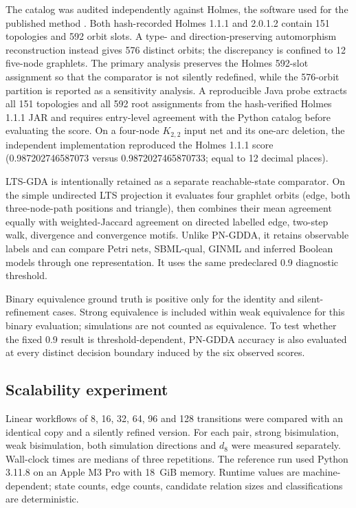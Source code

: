 \documentclass[pdflatex,sn-mathphys-ay]{sn-jnl}
\theoremstyle{definition}
\begin{document}
The catalog was audited independently against Holmes, the software used for the
published method \citep{Radom2017}. Both hash-recorded Holmes 1.1.1 and 2.0.1.2
contain 151 topologies and 592 orbit slots. A type- and direction-preserving
automorphism reconstruction instead gives 576 distinct orbits; the discrepancy
is confined to 12 five-node graphlets. The primary analysis preserves the Holmes
592-slot assignment so that the comparator is not silently redefined, while the
576-orbit partition is reported as a sensitivity analysis. A reproducible Java
probe extracts all 151 topologies and all 592 root assignments from the
hash-verified Holmes 1.1.1 JAR and requires entry-level agreement with the
Python catalog before evaluating the score. On a four-node
$K_{2,2}$ input net and its one-arc deletion, the independent implementation
reproduced the Holmes 1.1.1 score (0.987202746587073 versus
0.9872027465870733; equal to 12 decimal places).

LTS-GDA is intentionally retained as a separate reachable-state comparator. On
the simple undirected LTS projection it evaluates four graphlet orbits (edge,
both three-node-path positions and triangle), then combines their mean agreement
equally with weighted-Jaccard agreement on directed labelled edge, two-step
walk, divergence and convergence motifs. Unlike PN-GDDA, it retains observable
labels and can compare Petri nets, SBML-qual, GINML and inferred Boolean models
through one representation. It uses the same predeclared 0.9 diagnostic
threshold.

Binary equivalence ground truth is positive only for the identity and silent-
refinement cases. Strong equivalence is included within weak equivalence for this
binary evaluation; simulations are not counted as equivalence. To test whether
the fixed 0.9 result is threshold-dependent, PN-GDDA accuracy is also evaluated
at every distinct decision boundary induced by the six observed scores.

\subsection{Scalability experiment}\label{sec:scalability-method}

Linear workflows of 8, 16, 32, 64, 96 and 128 transitions were compared with an
identical copy and a silently refined version. For each pair, strong bisimulation,
weak bisimulation, both simulation directions and $d_8$ were measured separately.
Wall-clock times are medians of three repetitions. The reference run used Python
3.11.8 on an Apple M3 Pro with 18~GiB memory. Runtime values are machine-dependent;
state counts, edge counts, candidate relation sizes and classifications are
deterministic.
\end{document}
